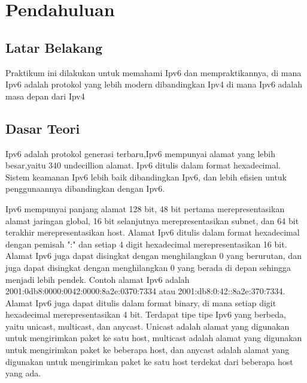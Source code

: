 \section{Pendahuluan}
\subsection{Latar Belakang}
Praktikum ini dilakukan untuk memahami Ipv6 dan mempraktikannya, di mana Ipv6 adalah protokol yang lebih modern dibandingkan
Ipv4 di mana Ipv6 adalah masa depan dari Ipv4

\subsection{Dasar Teori}
Ipv6 adalah protokol generasi terbaru,Ipv6 mempunyai alamat yang lebih besar,yaitu 340 undecillion alamat.
Ipv6 ditulis dalam format hexadecimal. Sistem keamanan Ipv6 lebih baik dibandingkan Ipv6, dan lebih efisien
untuk penggunaannya dibandingkan dengan Ipv6.

Ipv6 mempunyai panjang alamat 128 bit, 48 bit pertama merepresentasikan alamat jaringan global, 16 bit selanjutnya
merepresentasikan subnet, dan 64 bit terakhir merepresentasikan host. Alamat Ipv6 ditulis dalam format hexadecimal
dengan pemisah ":" dan setiap 4 digit hexadecimal merepresentasikan 16 bit. Alamat Ipv6 juga dapat disingkat
dengan menghilangkan 0 yang berurutan, dan juga dapat disingkat dengan menghilangkan 0 yang berada di depan
sehingga menjadi lebih pendek. Contoh alamat Ipv6 adalah 2001:0db8:0000:0042:0000:8a2e:0370:7334
atau 2001:db8:0:42::8a2e:370:7334. Alamat Ipv6 juga dapat ditulis dalam format binary, di mana setiap digit
hexadecimal merepresentasikan 4 bit. Terdapat tipe tipe Ipv6 yang berbeda, yaitu unicast, multicast, dan anycast.
Unicast adalah alamat yang digunakan untuk mengirimkan paket ke satu host, multicast adalah alamat yang digunakan
untuk mengirimkan paket ke beberapa host, dan anycast adalah alamat yang digunakan untuk mengirimkan paket
ke satu host terdekat dari beberapa host yang ada.	

